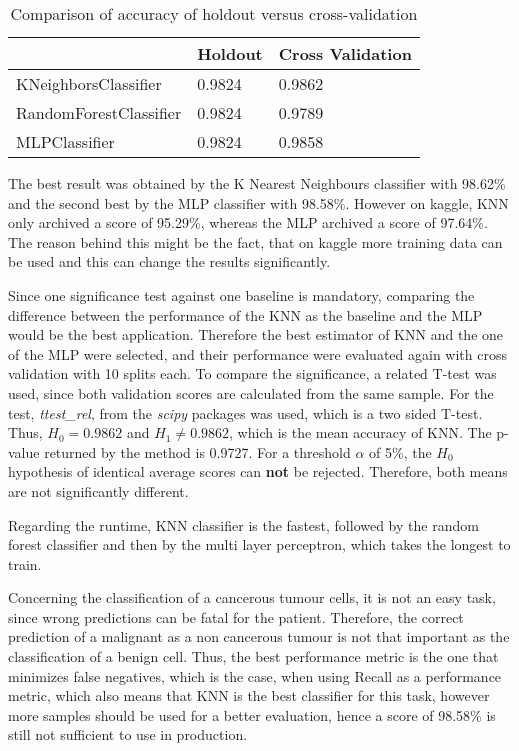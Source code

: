\begin{table}[H]
\begin{center}
\begin{tabular}{|l|l|l|}
\hline
                       & Holdout & Cross Validation \\ \hline
KNeighborsClassifier   & 0.9824  & 0.9862           \\ \hline
RandomForestClassifier & 0.9824  & 0.9789           \\ \hline
MLPClassifier          & 0.9824  & 0.9858           \\ \hline
\end{tabular}
\caption{Comparison of accuracy of holdout versus cross-validation}
\end{center}
\end{table}

The best result was obtained by the K Nearest Neighbours classifier with 98.62\% and the second best by the MLP classifier with 98.58\%. However on kaggle, KNN only archived a score of 95.29\%, whereas the MLP archived a score of 97.64\%. The reason behind this might be the fact, that on kaggle more training data can be used and this can change the results significantly.

Since one significance test against one baseline is mandatory, comparing the difference between the performance of the KNN as the baseline and the MLP would be the best application. Therefore the best estimator of KNN and the one of the MLP were selected, and their performance were evaluated again with cross validation with 10 splits each. To compare the significance, a related T-test was used, since both validation scores are calculated from the same sample. For the test, \textit{ttest\_rel}, from the \textit{scipy} packages was used, which is a two sided T-test. Thus, $H_0=0.9862$ and $H_1\neq0.9862$, which is the mean accuracy of KNN. The p-value returned by the method is 0.9727. For a threshold $\alpha$ of 5\%, the $H_0$ hypothesis of identical average scores can \textbf{not} be rejected. Therefore, both means are not significantly different.


Regarding the runtime, KNN classifier is the fastest, followed by the random forest classifier and then by the multi layer perceptron, which takes the longest to train.

Concerning the classification of a cancerous tumour cells, it is not an easy task, since wrong predictions can be fatal for the patient. Therefore, the correct prediction of a malignant as a non cancerous tumour is not that important as the classification of a benign cell. Thus, the best performance metric is the one that minimizes false negatives, which is the case, when using Recall as a performance metric, which also means that KNN is the best classifier for this task, however more samples should be used for a better evaluation, hence a score of 98.58\% is still not sufficient to use in production.

